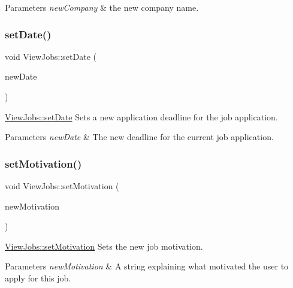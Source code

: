 \begin{DoxyParams}{Parameters}
{\em new\+Company} & the new company name. \\
\hline
\end{DoxyParams}
\mbox{\label{class_view_jobs_a7574794410eb40956f343976de97221f}} 
\subsubsection{\texorpdfstring{set\+Date()}{setDate()}}
{\footnotesize\ttfamily void View\+Jobs\+::set\+Date (\begin{DoxyParamCaption}\item[{Q\+String}]{new\+Date }\end{DoxyParamCaption})}



\mbox{\hyperlink{class_view_jobs_a7574794410eb40956f343976de97221f}{View\+Jobs\+::set\+Date}} Sets a new application deadline for the job application. 


\begin{DoxyParams}{Parameters}
{\em new\+Date} & The new deadline for the current job application. \\
\hline
\end{DoxyParams}
\mbox{\label{class_view_jobs_a53bdfabaf2b442841d676f42ebbf975f}} 
\subsubsection{\texorpdfstring{set\+Motivation()}{setMotivation()}}
{\footnotesize\ttfamily void View\+Jobs\+::set\+Motivation (\begin{DoxyParamCaption}\item[{Q\+String}]{new\+Motivation }\end{DoxyParamCaption})}



\mbox{\hyperlink{class_view_jobs_a53bdfabaf2b442841d676f42ebbf975f}{View\+Jobs\+::set\+Motivation}} Sets the new job motivation. 


\begin{DoxyParams}{Parameters}
{\em new\+Motivation} & A string explaining what motivated the user to apply for this job. \\
\hline
\end{DoxyParams}
\mbox{\label{class_view_jobs_a55943415fd91377d5f701f7074ba58d6}} 
